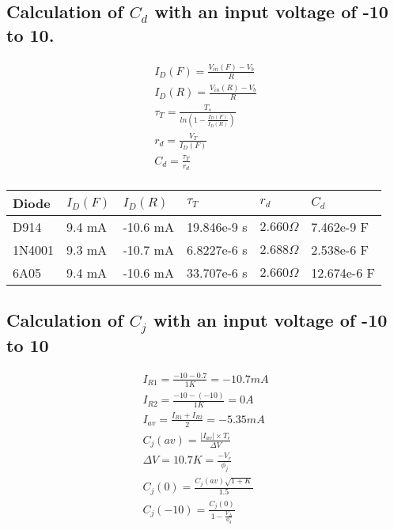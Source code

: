 \documentclass[dvips,10pt]{report}
\begin{document}
\subsection{Calculation of $C_d$ with an input voltage of -10 to 10.}

\begin{eqnarray}
	I_D(F) = \frac{V_{in}(F) - V_b}{R} \\
	I_D(R) = \frac{V_{in}(R) - V_b}{R} \\
	\tau_T = \frac{T_s}{ln \left( 1 - \frac{I_D(F)}{I_D(R)} \right) } \\
	r_d = \frac{V_T}{I_D(F)} \\
	C_d = \frac{\tau_T}{r_d} \\
\end{eqnarray}


\begin{center}
\begin{tabularx}{\textwidth}{X|X|X|X|X|X}

	Diode  & $I_D(F)$ & $I_D(R)$ & $\tau_T$    & $r_d$ & $C_d$ \\ \hline
	
	D914   & 9.4 mA    & -10.6 mA & 19.846e-9 s & $2.660 \Omega$ &
	7.462e-9 F\\

	1N4001 & 9.3 mA    & -10.7 mA & 6.8227e-6 s & $2.688 \Omega$ & 
	2.538e-6 F\\

	6A05   & 9.4 mA    & -10.6 mA & 33.707e-6 s & $2.660 \Omega$ &
	12.674e-6 F

\end{tabularx}
\end{center}


\subsection{Calculation of $C_j$ with an input voltage of -10 to 10}

\begin{eqnarray}
	I_{R1} = \frac{-10 - 0.7}{1K} = -10.7 mA \\
	I_{R2} = \frac{-10 - (-10)}{1K}	= 0 A	\\
	I_{av} = \frac{I_{R1} + I_{R2}}{2} = -5.35 mA \\
	C_j(av) = \frac{|I_{av}| \times T_r}{\Delta V}\\
	\Delta V = 10.7
	K = \frac{-V_r}{\phi_j} \\
	C_j(0) = \frac{C_j(av) \sqrt{1 + K}}{1.5} \\
	C_j(-10) = \frac{C_j(0)}{1-\frac{V_\Delta}{\phi_d}}
\end{eqnarray}
\end{document}
